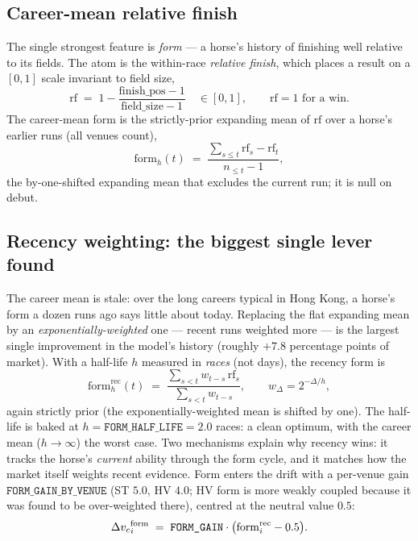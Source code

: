 \subsection{Career-mean relative finish}

The single strongest feature is \emph{form} --- a horse's history of finishing well relative to
its fields. The atom is the within-race \emph{relative finish}, which places a result on a
$[0,1]$ scale invariant to field size,
\begin{equation}
  \mathrm{rf} \;=\; 1 - \frac{\text{finish\_pos}-1}{\text{field\_size}-1}
  \quad\in[0,1], \qquad \mathrm{rf}=1 \text{ for a win.}
  \label{eq:relfin}
\end{equation}
The career-mean form is the strictly-prior expanding mean of $\mathrm{rf}$ over a horse's earlier
runs (all venues count),
\begin{equation}
  \mathrm{form}_h(t) \;=\;
   \frac{\sum_{s\le t}\mathrm{rf}_s - \mathrm{rf}_t}{n_{\le t}-1},
  \label{eq:form}
\end{equation}
the by-one-shifted expanding mean that excludes the current run; it is null on debut.

\subsection{Recency weighting: the biggest single lever found}

The career mean is stale: over the long careers typical in Hong Kong, a horse's form a dozen runs
ago says little about today. Replacing the flat expanding mean by an \emph{exponentially-weighted}
one --- recent runs weighted more --- is the largest single improvement in the model's history
(roughly $+7.8$ percentage points of market). With a half-life $h$ measured in \emph{races}
(not days), the recency form is
\begin{equation}
  \mathrm{form}^{\mathrm{rec}}_h(t)
   \;=\; \frac{\sum_{s<t} w_{t-s}\,\mathrm{rf}_s}{\sum_{s<t} w_{t-s}},
   \qquad w_{\Delta} = 2^{-\Delta/h},
  \label{eq:recform}
\end{equation}
again strictly prior (the exponentially-weighted mean is shifted by one). The half-life is baked
at $h=\texttt{FORM\_HALF\_LIFE}=2.0$ races: a clean optimum, with the career mean ($h\to\infty$)
the worst case. Two mechanisms explain why recency wins: it tracks the horse's \emph{current}
ability through the form cycle, and it matches how the market itself weights recent evidence.
Form enters the drift with a per-venue gain $\texttt{FORM\_GAIN\_BY\_VENUE}$ (ST $5.0$, HV $4.0$;
HV form is more weakly coupled because it was found to be over-weighted there), centred at the
neutral value $0.5$:
\begin{equation}
  \Delta{v_{c}}^{\text{form}}_i \;=\; \texttt{FORM\_GAIN}\cdot\bigl(\mathrm{form}^{\mathrm{rec}}_i - 0.5\bigr).
  \label{eq:formcoupling}
\end{equation}

